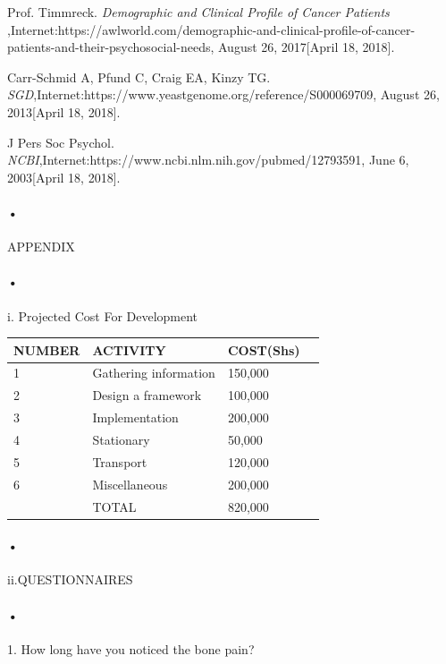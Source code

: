 \documentclass[12pt]{article}
\begin{document}
\begin{thebibliography}{9}

 Prof. Timmreck. \textit{Demographic and Clinical Profile of Cancer Patients },Internet:https://awlworld.com/demographic-and-clinical-profile-of-cancer-patients-and-their-psychosocial-needs, August 26, 2017[April 18, 2018].


Carr-Schmid A, Pfund C, Craig EA, Kinzy TG. \textit{SGD},Internet:https://www.yeastgenome.org/reference/S000069709, August 26, 2013[April 18, 2018].

J Pers Soc Psychol. \textit{NCBI},Internet:https://www.ncbi.nlm.nih.gov/pubmed/12793591, June 6, 2003[April 18, 2018].



\end{thebibliography}







\paragraph{•}APPENDIX
\paragraph{•} i. Projected Cost For Development

\begin{center}
\begin{tabular}{|l|l|l|c|}
\hline NUMBER  & ACTIVITY & COST(Shs) \\\hline

1 & Gathering information & 150,000 \\\hline
2 & Design a framework & 100,000\\\hline
3 &Implementation & 200,000 \\\hline
4 & Stationary & 50,000\\\hline
5 & Transport & 120,000\\\hline
6 & Miscellaneous & 200,000\\\hline
  & TOTAL & 820,000\\\hline
\end{tabular}
\end{center}

\paragraph{•} ii.QUESTIONNAIRES
\paragraph{•}1. How long have you noticed the bone pain?
\end{document}
